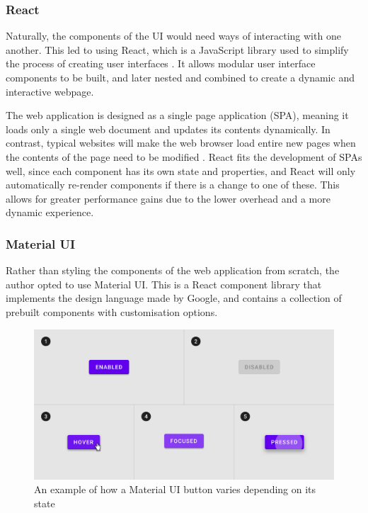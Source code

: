 \subsubsection{React}
Naturally, the components of the UI would need ways of interacting with one another. This led to using React, which is a JavaScript library used to simplify the process of creating user interfaces \cite{whatisReact}. It allows modular user interface components to be built, and later nested and combined to create a dynamic and interactive webpage. 

The web application is designed as a single page application (SPA), meaning it loads only a single web document and updates its contents dynamically. In contrast, typical websites will make the web browser load entire new pages when the contents of the page need to be modified \cite{singlepageapp}. React fits the development of SPAs well, since each component has its own state and properties, and React will only automatically re-render components if there is a change to one of these. This allows for greater performance gains due to the lower overhead and a more dynamic experience.

\subsubsection{Material UI}
 Rather than styling the components of the web application from scratch, the author opted to use Material UI. This is a React component library that implements the design language made by Google, and contains a collection of prebuilt components with customisation options.

\begin{figure}[h]
    \centering
    \includegraphics[scale=0.35]{./images/materialUIbutton.png}
    \caption{An example of how a Material UI button varies depending on its state \cite{materialUIbuttons}}
\end{figure}

